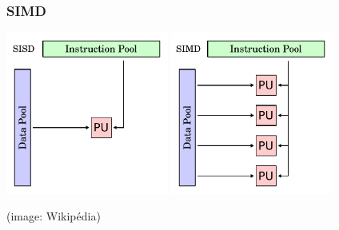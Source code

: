\documentclass[xcolor={x11names,svgnames,psnames}]{beamer}
\begin{document}
\begin{frame}
\frametitle{SIMD}

\includegraphics[width=0.4\textwidth]{SISD}
\hfill
\includegraphics[width=0.4\textwidth]{SIMD}

\hfill (image: Wikipédia)

\end{frame}



\end{document}
